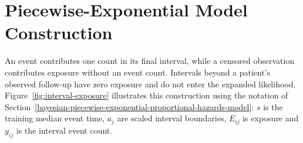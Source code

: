 \chapter{Piecewise-Exponential Model Construction}\label{appendix-e-piecewise-exponential-model-construction}\label{app:intervals}

An event contributes one count in its final interval, while a censored observation contributes exposure without an event count. Intervals beyond a patient's observed follow-up have zero exposure and do not enter the expanded likelihood. Figure~\ref{fig:interval-exposure} illustrates this construction using the notation of Section~\ref{bayesian-piecewise-exponential-proportional-hazards-model}: $s$ is the training median event time, $a_j$ are scaled interval boundaries, $E_{ij}$ is exposure and $y_{ij}$ is the interval event count.


